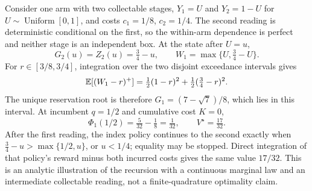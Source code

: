 \begin{example}
\label{ex:continuous-collection}
Consider one arm with two collectable stages, $Y_1=U$ and $Y_2=1-U$ for
$U\sim\operatorname{Uniform}[0,1]$, and costs $c_1=1/8$, $c_2=1/4$.
The second reading is deterministic conditional on the first, so the within-arm dependence
is perfect and neither stage is an independent box. At the state after $U=u$,
\[
G_2(u)=Z_2(u)=\tfrac34-u,\qquad
W_1=\max\{U,\tfrac34-U\}.
\]
For $r\in[3/8,3/4]$, integration over the two disjoint exceedance intervals gives
\[
\mathbb{E}[(W_1-r)^+]=\tfrac12(1-r)^2+\tfrac12(\tfrac34-r)^2.
\]
The unique reservation root is therefore
$G_1=(7-\sqrt7)/8$, which lies in this interval. At incumbent $q=1/2$ and cumulative cost $K=0$,
\[
\Phi_1(1/2)=\tfrac{5}{32}-\tfrac18=\tfrac1{32},\qquad
V^\star=\tfrac{17}{32}.
\]
After the first reading, the index policy continues to the second exactly when
$\tfrac34-u>\max\{1/2,u\}$, or $u<1/4$; equality may be stopped. Direct integration of that
policy's reward minus both incurred costs gives the same value $17/32$. This is an analytic
illustration of the recursion with a continuous marginal law and an intermediate collectable
reading, not a finite-quadrature optimality claim.
\end{example}
